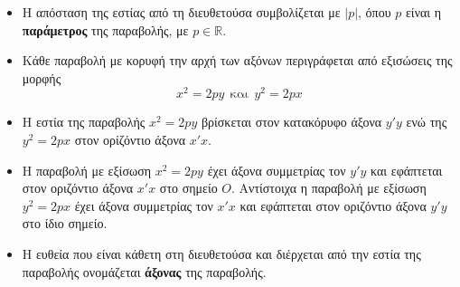 \begin{itemize}
\item Η απόσταση της εστίας από τη διευθετούσα συμβολίζεται με $ |p| $, όπου $ p $ είναι η \textbf{παράμετρος} της παραβολής, με $ p\in\mathbb{R} $.
\item Κάθε παραβολή με κορυφή την αρχή των αξόνων περιγράφεται από εξισώσεις της μορφής \[ x^2=2py\ \ \textrm{και}\ \  y^2=2px \]
\item Η εστία της παραβολής $ x^2=2py $ βρίσκεται στον κατακόρυφο άξονα $ y'y $ ενώ της $ y^2=2px $ στον ορίζόντιο άξονα $ x'x $.
\item Η παραβολή με εξίσωση $ x^2=2py $ έχει άξονα συμμετρίας τον $ y'y $ και εφάπτεται στον οριζόντιο άξονα $ x'x $ στο σημείο $ O $. Αντίστοιχα η παραβολή με εξίσωση $ y^2=2px $ έχει άξονα συμμετρίας τον $ x'x $ και εφάπτεται στον οριζόντιο άξονα $ y'y $ στο ίδιο σημείο.
\item Η ευθεία που είναι κάθετη στη διευθετούσα και διέρχεται από την εστία της παραβολής ονομάζεται \textbf{άξονας} της παραβολής.
\end{itemize}
